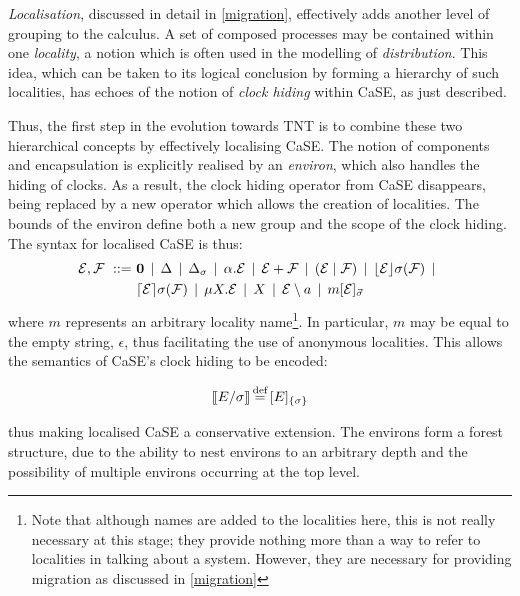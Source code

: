 \emph{Localisation}, discussed in detail in \ref{migration}, effectively
adds another level of grouping to the calculus.  A set of composed
processes may be contained within one \emph{locality}, a notion which is
often used in the modelling of \emph{distribution}.  This idea, which
can be taken to its logical conclusion by forming a hierarchy of such
localities, has echoes of the notion of \emph{clock hiding} within CaSE,
as just described.

Thus, the first step in the evolution towards TNT is to combine these
two hierarchical concepts by effectively localising CaSE.  The notion of
components and encapsulation is explicitly realised by an
\emph{environ}, which also handles the hiding of clocks.  As a result,
the clock hiding operator from CaSE disappears, being replaced by a new
operator which allows the creation of localities.  The bounds of the
environ define both a new group and the scope of the clock hiding.  The
syntax for localised CaSE is thus:
\begin{equation}
  \begin{aligned}
    \text{$\mathcal{E}$}, \text{$\mathcal{F}$}\ ::=\ &
    \textbf{0}  \;\,|\,\; 
    \Delta \;\,|\,\; 
    \Delta_{\sigma} \;\,|\,\; 
    \alpha . \text{$\mathcal{E}$}  \;\,|\,\;
    \text{$\mathcal{E}$} + \text{$\mathcal{F}$} \;\,|\,\; 
    (\text{$\mathcal{E}$}\;|\;\text{$\mathcal{F}$})\;\,|\,\; 
    \lfloor{\text{$\mathcal{E}$}}\rfloor {\sigma} ({\text{$\mathcal{F}$}}) \;\,|\,\; \\
    & \lceil{\text{$\mathcal{E}$}}\rceil {\sigma} ({\text{$\mathcal{F}$}}) \;\,|\,\; 
    \mu X . \text{$\mathcal{E}$} \;\,|\,\; 
    X \;\,|\,\; 
    \text{$\mathcal{E}$} \setminus a \;\,|\,\; 
    {m}[ \text{$\mathcal{E}$} ]_{\vec{\sigma}}
  \end{aligned}
\end{equation}
where $m$ represents an arbitrary locality name\footnote{Note
that although names are added to the localities here, this is not really
necessary at this stage; they provide nothing more than a way to refer
to localities in talking about a system.  However, they are necessary
for providing migration as discussed in \ref{migration}}.  In
particular, $m$ may be equal to the empty string, $\epsilon$, thus
facilitating the use of anonymous localities.  This allows the semantics
of CaSE's clock hiding to be encoded:

\begin{equation}
[\hspace{-0.3ex}[ E / \sigma ]\hspace{-0.3ex}] \operatorname{\stackrel{\textrm{def}}{=}} {}[ E ]_{\{\sigma\}}
\end{equation}

\noindent thus making localised CaSE a conservative extension.  The
environs form a forest structure, due to the ability to nest
environs to an arbitrary depth and the possibility of multiple
environs occurring at the top level.

